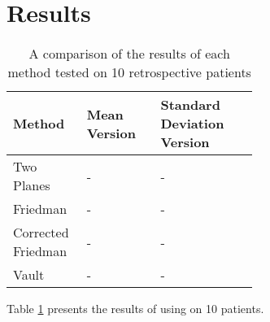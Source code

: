 \section{Results}
\label{sec:results}
\begin{table}
	\begin{center}
		\begin{tabular}{|p{0.3\linewidth}|p{0.3\linewidth}|p{}|} \hline
			Method & Mean Version & Standard Deviation Version \\ \hline
			Two Planes & - & - \\
			Friedman & - & - \\
			Corrected Friedman & - & - \\
			Vault & - & - \\
                        \hline
		\end{tabular}
	\end{center}
	\caption{\label{tab:results}A comparison of the results of each method tested 
	on 10 retrospective patients}
\end{table}

Table \ref{tab:results} presents the results of using \sksglenoid on 10 patients.
